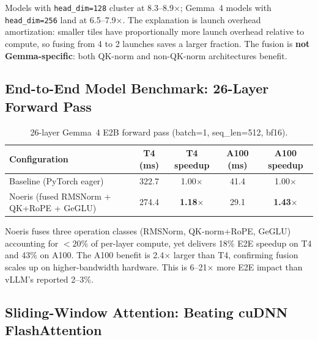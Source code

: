 \documentclass[11pt]{article}
\begin{document}
Models with \texttt{head\_dim=128} cluster at 8.3--8.9$\times$; Gemma~4 models
with \texttt{head\_dim=256} land at 6.5--7.9$\times$. The explanation is launch
overhead amortization: smaller tiles have proportionally more launch overhead
relative to compute, so fusing from 4 to 2 launches saves a larger fraction.
The fusion is \textbf{not Gemma-specific}: both QK-norm and non-QK-norm
architectures benefit.


\subsection{End-to-End Model Benchmark: 26-Layer Forward Pass}
\label{sec:e2e}

\begin{table}[t]
\centering
\caption{26-layer Gemma~4 E2B forward pass (batch=1, seq\_len=512, bf16).}
\label{tab:e2e}
\small
\begin{tabular}{@{}lcccc@{}}
\toprule
Configuration & T4 (ms) & T4 speedup & A100 (ms) & A100 speedup \\
\midrule
Baseline (PyTorch eager) & 322.7 & 1.00$\times$ & 41.4 & 1.00$\times$ \\
Noeris (fused RMSNorm + QK+RoPE + GeGLU) & 274.4 & \textbf{1.18$\times$} & 29.1 & \textbf{1.43$\times$} \\
\bottomrule
\end{tabular}
\end{table}

Noeris fuses three operation classes (RMSNorm, QK-norm+RoPE, GeGLU) accounting
for ${<}20\%$ of per-layer compute, yet delivers 18\% E2E speedup on T4 and
43\% on A100. The A100 benefit is 2.4$\times$ larger than T4, confirming fusion
scales up on higher-bandwidth hardware. This is 6--21$\times$ more E2E impact
than vLLM's reported 2--3\%.


\subsection{Sliding-Window Attention: Beating cuDNN FlashAttention}
\label{sec:swa-eval}
\end{document}
